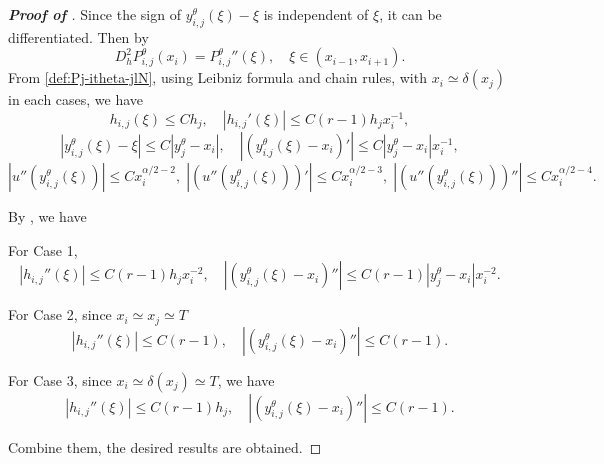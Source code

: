 \documentclass{amsart}
\theoremstyle{definition}
\theoremstyle{remark}
\numberwithin{equation}{section}
\begin{document}
\begin{proof} [\bf Proof of ]
  Since the sign of \(y_{i,j}^\theta(\xi) - \xi\) is independent of \(\xi\), it can be differentiated. 
  Then by 
  \begin{equation*}
    D_h^2 {P_{i,j}^\theta}(x_i) = {P_{i,j}^\theta}''(\xi), \quad \xi\in (x_{i-1}, x_{i+1}).
  \end{equation*}
  From \eqref{def:Pj-itheta-jlN}, using Leibniz formula and chain rules,
  with \(x_i \simeq \delta(x_j)\) in each cases, we have
  \begin{equation*}
    h_{i,j}(\xi) \le C h_j, \quad |h_{i,j}'(\xi)| \le C(r-1) h_j x_i^{-1},
  \end{equation*}
  \begin{equation*}
    |y_{i,j}^\theta(\xi) - \xi| \le C |y_j^\theta - x_i|, \quad 
    \left|(y_{i.j}^\theta(\xi) - x_i)'\right| \le C |y_j^\theta - x_i| x_i^{-1},
  \end{equation*}
  \begin{equation*}
    \left|u''(y_{i,j}^\theta(\xi))\right| \le C x_i^{\alpha/2-2}, \;
    \left|\left(u''(y_{i,j}^\theta(\xi))\right)'\right| \le C x_i^{\alpha/2-3}, \; 
    \left|\left(u''(y_{i,j}^\theta(\xi))\right)''\right| \le C x_i^{\alpha/2-4}.
  \end{equation*}
  
  By , we have

  For Case 1, 
  \begin{equation*}
    |h_{i,j}''(\xi)| \le C(r-1) h_j x_i^{-2}, \quad 
    \left|(y_{i,j}^\theta(\xi) - x_i)''\right| \le C(r-1) |y_j^\theta - x_i| x_i^{-2}.
  \end{equation*}
  
  For Case 2, since \(x_i \simeq x_j \simeq T\)
  \begin{equation*}
    |h_{i,j}''(\xi)| \le C(r-1), \quad 
    \left|(y_{i,j}^\theta(\xi) - x_i)''\right| \le C(r-1).
  \end{equation*}
  
  For Case 3, since \(x_i \simeq \delta(x_j) \simeq T\), we have
  \begin{equation*}
    |h_{i,j}''(\xi)| \le C(r-1) h_j, \quad 
    \left|(y_{i,j}^\theta(\xi) - x_i)''\right| \le C(r-1).
  \end{equation*}
  
  Combine them, the desired results are obtained.
\end{proof}
\end{document}
